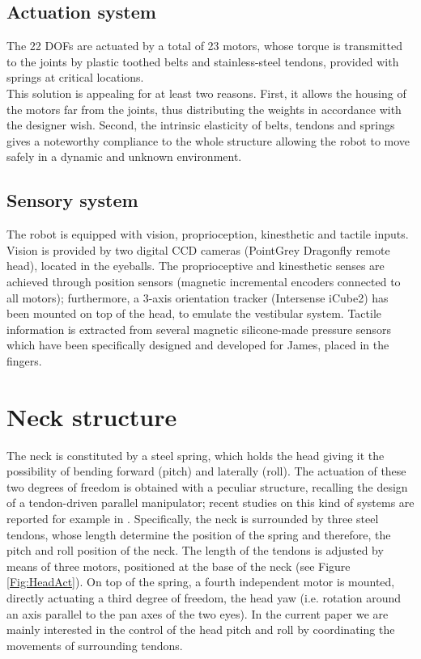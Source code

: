 \documentclass[conference]{IEEEtran}
\numberwithin{equation}{section}
\begin{document}
\subsection{Actuation system}

The 22 DOFs are actuated by a total of 23 motors, whose torque is transmitted to the joints by plastic toothed belts and stainless-steel tendons, provided with springs at critical locations.\\This solution is appealing for at least two reasons. First, it allows the housing of the motors far from the joints, thus distributing the weights in accordance with the designer wish. Second, the intrinsic elasticity of belts, tendons and springs gives a noteworthy compliance to the whole structure allowing the robot to move safely in a dynamic and unknown environment.

\subsection{Sensory system}

The robot is equipped with vision, proprioception, kinesthetic and tactile inputs. Vision is provided by two digital CCD cameras (PointGrey Dragonfly remote head), located in the eyeballs. The proprioceptive and kinesthetic senses are achieved through position sensors (magnetic incremental encoders connected to all motors); furthermore, a 3-axis orientation tracker (Intersense iCube2) has been mounted on top of the head, to emulate the vestibular system. Tactile information is extracted from several magnetic silicone-made pressure sensors which have been specifically designed and developed for James, placed in the fingers.

\section{Neck structure} \label{Sec:NeckStructure}

The neck is constituted by a steel spring, which holds the head giving it the possibility of bending forward (pitch) and laterally (roll). The actuation of these two degrees of freedom is obtained with a peculiar structure, recalling the design of a tendon-driven parallel manipulator; recent studies on this kind of systems are reported for example in \cite{Verhoeven00parallel,Hay05parallel}. Specifically, the neck is surrounded by three steel tendons, whose length determine the position of the spring and therefore, the pitch and roll position of the neck. The length of the tendons is adjusted by means of three motors, positioned at the base of the neck (see Figure \ref{Fig:HeadAct}). On top of the spring, a fourth independent motor is mounted, directly actuating a third degree of freedom, the head yaw (i.e. rotation around an axis parallel to the pan axes of the two eyes). In the current paper we are mainly interested in the control of the head pitch and roll by coordinating the movements of surrounding tendons.
\end{document}
